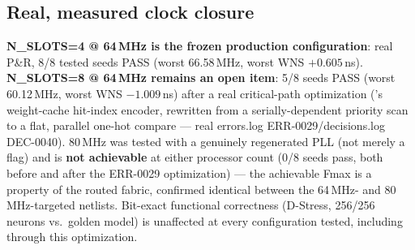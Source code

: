 \subsection{Real, measured clock closure}
\textbf{N\_SLOTS=4 @ 64\,MHz is the frozen production configuration}:
real  P\&R, 8/8 tested seeds PASS (worst 66.58\,MHz,
worst WNS $+0.605$\,ns). \textbf{N\_SLOTS=8 @ 64\,MHz remains an open
item}: 5/8 seeds PASS (worst 60.12\,MHz, worst WNS $-1.009$\,ns) after
a real critical-path optimization ('s
weight-cache hit-index encoder, rewritten from a serially-dependent
priority scan to a flat, parallel one-hot compare --- real errors.log
ERR-0029/decisions.log DEC-0040). 80\,MHz was tested with a genuinely
regenerated PLL (not merely a  flag) and is \textbf{not
achievable} at either processor count (0/8 seeds pass, both before and
after the ERR-0029 optimization) --- the achievable Fmax is a property
of the routed fabric, confirmed identical between the 64\,MHz- and
80\,MHz-targeted netlists. Bit-exact functional correctness (D-Stress,
256/256 neurons vs.\ golden model) is unaffected at every configuration
tested, including through this optimization.
